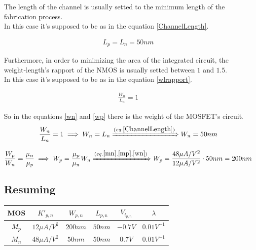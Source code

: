 The length of the channel is usually setted to the minimum length of the fabrication process.\\
In this case it's supposed to be as in the equation \ref{ChannelLength}.\par
\begin{align}
L_p = L_n = 50 nm \label{ChannelLength}
\end{align}

Furthermore, in order to minimizing the area of the integrated circuit, the weight-length's rapport of the NMOS is usually setted between $1$ and $1.5$.\\
In this case it's supposed to be as in the equation \ref{wlrapport}. \par
\begin{align}
\frac{W_n}{L_n} = 1 \label{wlrapport}
\end{align}

So in the equations \ref{wn} and \ref{wp} there is the weight of the MOSFET's circuit.\\

\begin{align}
\frac{W_n}{L_n} = 1 \implies W_n = L_n \xRightarrow{(eq. \ref{ChannelLength})} W_n = 50nm \label{wn}
\end{align} 

\begin{align}
\frac{W_p}{W_n} = \frac{\mu _n}{\mu _p} \implies W_p = \frac{\mu _p}{\mu _n}W_n \xRightarrow{(eq. \ref{mn}, \ref{mp}, \ref{wn})} W_p = \frac{48 \mu A / V^2}{12 \mu A / V^2} \cdot 50nm = 200nm \label{wp}
\end{align}

\subsection{Resuming}\label{MOSProperties}
\begin{center}
\begin{tabular}{|c|c|c|c|c|c|}
\hline
MOS & $K'_{p,n}$ & $W_{p,n}$ & $L_{p,n}$ & $V_{t_{p,n}}$ & $\lambda$\\
\hline
$M_p$ & $12 \mu A / V^2$ & $200nm$ & $50nm$ & $-0.7V$ & $0.01 V^{-1}$\\
$M_n$ & $48 \mu A / V^2$ & $50nm$ & $50nm$ & $0.7V$ & $0.01 V^{-1}$\\
\hline
\end{tabular}
\end{center}

